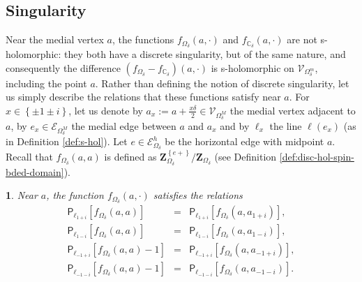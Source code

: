 \documentclass[oneside,english]{amsart}
\numberwithin{equation}{section}
\numberwithin{figure}{section}
\theoremstyle{plain}
\theoremstyle{plain}
\theoremstyle{plain}
\theoremstyle{plain}
\newtheorem{prop}[thm]{\protect\propositionname}
\theoremstyle{plain}
\theoremstyle{definition}
\theoremstyle{remark}
\providecommand{\propositionname}{Proposition}
\begin{document}
\subsection{Singularity}

Near the medial vertex $a$, the functions $f_{\Omega_{\delta}}\left(a,\cdot\right)$
and $f_{\mathbb{C}_{\delta}}\left(a,\cdot\right)$ are not s-holomorphic:
they both have a discrete singularity, but of the same nature, and
consequently the difference $\left(f_{\Omega_{\delta}}-f_{\mathbb{C}_{\delta}}\right)\left(a,\cdot\right)$
is s-holomorphic on $\mathcal{V}_{\Omega_{\delta}^{m}}$, including
the point $a$. Rather than defining the notion of discrete singularity,
let us simply describe the relations that these functions satisfy
near $a$. For $x\in\left\{ \pm1\pm i\right\} $, let us denote by
$a_{x}:=a+\frac{x\delta}{2}\in\mathcal{V}_{\Omega_{\delta}^{M}}$
the medial vertex adjacent to $a$, by $e_{x}\in\mathcal{E}_{\Omega_{\delta}^{M}}$
the medial edge between $a$ and $a_{x}$ and by $\ell_{x}$ the line
$\ell\left(e_{x}\right)$ (as in Definition \ref{def:s-hol}). Let
$e\in\mathcal{E}_{\Omega_{\delta}}^{h}$ be the horizontal edge with
midpoint $a$. Recall that $f_{\Omega_{\delta}}\left(a,a\right)$
is defined as $\mathbf{Z}_{\Omega_{\delta}}^{\left\{ e+\right\} }/\mathbf{Z}_{\Omega_{\delta}}$
(see Definition \ref{def:disc-hol-spin-bded-domain}).
\begin{prop}
\label{pro:discrete-singularity-bounded-domain-obs}Near $a$, the
function $f_{\Omega_{\delta}}\left(a,\cdot\right)$ satisfies the
relations
\begin{eqnarray*}
\mathsf{P}_{\ell_{1+i}}\left[f_{\Omega_{\delta}}\left(a,a\right)\right] & = & \mathsf{P}_{\ell_{1+i}}\left[f_{\Omega_{\delta}}\left(a,a_{1+i}\right)\right],\\
\mathsf{P}_{\ell_{1-i}}\left[f_{\Omega_{\delta}}\left(a,a\right)\right] & = & \mathsf{P}_{\ell_{1-i}}\left[f_{\Omega_{\delta}}\left(a,a_{1-i}\right)\right],\\
\mathsf{P}_{\ell_{-1+i}}\left[f_{\Omega_{\delta}}\left(a,a\right)-1\right] & = & \mathsf{P}_{\ell_{-1+i}}\left[f_{\Omega_{\delta}}\left(a,a_{-1+i}\right)\right],\\
\mathsf{P}_{\ell_{-1-i}}\left[f_{\Omega_{\delta}}\left(a,a\right)-1\right] & = & \mathsf{P}_{\ell_{-1-i}}\left[f_{\Omega_{\delta}}\left(a,a_{-1-i}\right)\right].
\end{eqnarray*}
\end{prop}
\end{document}
